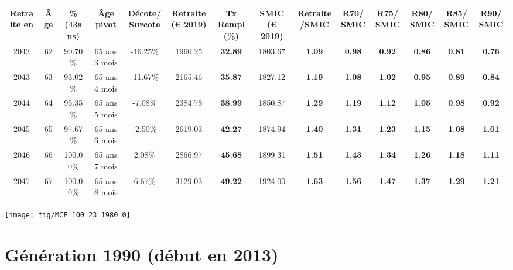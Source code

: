 \begin{adjustbox}{max width=\textwidth} 
\begin{tabular}[htb]{|c|c||c|c|c||c|c||c|c||c|c|c|c|c|} 
\hline 
 Retraite en &  Âge &  \%(43ans) &  Âge pivot &  Décote/Surcote &  Retraite (\euro{} 2019) &  Tx Rempl(\%) &  SMIC (\euro{} 2019) &  Retraite/SMIC &  R70/SMIC &  R75/SMIC &  R80/SMIC &  R85/SMIC &  R90/SMIC \\ 
\hline \hline 
 2042 &  62 &  90.70\% &  65 ans 3 mois &  -16.25\% &  1960.25 &  {\bf 32.89} &  1803.67 &  {\bf 1.09} &  {\bf {\color{red} 0.98}} &  {\bf {\color{red} 0.92}} &  {\bf {\color{red} 0.86}} &  {\bf {\color{red} 0.81}} &  {\bf {\color{red} 0.76}} \\ 
\hline 
 2043 &  63 &  93.02\% &  65 ans 4 mois &  -11.67\% &  2165.46 &  {\bf 35.87} &  1827.12 &  {\bf 1.19} &  {\bf 1.08} &  {\bf 1.02} &  {\bf {\color{red} 0.95}} &  {\bf {\color{red} 0.89}} &  {\bf {\color{red} 0.84}} \\ 
\hline 
 2044 &  64 &  95.35\% &  65 ans 5 mois &  -7.08\% &  2384.78 &  {\bf 38.99} &  1850.87 &  {\bf 1.29} &  {\bf 1.19} &  {\bf 1.12} &  {\bf 1.05} &  {\bf {\color{red} 0.98}} &  {\bf {\color{red} 0.92}} \\ 
\hline 
 2045 &  65 &  97.67\% &  65 ans 6 mois &  -2.50\% &  2619.03 &  {\bf 42.27} &  1874.94 &  {\bf 1.40} &  {\bf 1.31} &  {\bf 1.23} &  {\bf 1.15} &  {\bf 1.08} &  {\bf 1.01} \\ 
\hline 
 2046 &  66 &  100.00\% &  65 ans 7 mois &  2.08\% &  2866.97 &  {\bf 45.68} &  1899.31 &  {\bf 1.51} &  {\bf 1.43} &  {\bf 1.34} &  {\bf 1.26} &  {\bf 1.18} &  {\bf 1.11} \\ 
\hline 
 2047 &  67 &  100.00\% &  65 ans 8 mois &  6.67\% &  3129.03 &  {\bf 49.22} &  1924.00 &  {\bf 1.63} &  {\bf 1.56} &  {\bf 1.47} &  {\bf 1.37} &  {\bf 1.29} &  {\bf 1.21} \\ 
\hline 
\hline 
\end{tabular} 
\end{adjustbox} 
 
 \vspace{0.1cm} 

 {\hspace{-2.2cm}\texttt{[image: fig/MCF\_100\_23\_1980\_0]}} 

\newpage 
 
\section{Génération 1990 (début en 2013)\label{MCF_100_23_1990_0}} 
 
